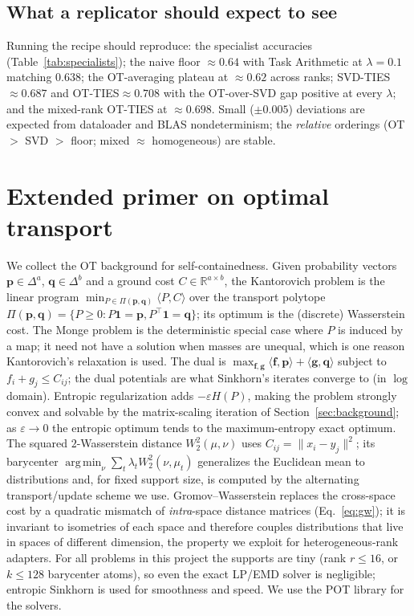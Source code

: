 \documentclass[11pt]{article}
\newcommand{\R}{\mathbb{R}}
\newcommand{\argmin}{\operatorname*{arg\,min}}
\newcommand{\otties}{\textsc{OT-TIES}}
\newcommand{\svdties}{\textsc{SVD-TIES}}
\begin{document}
\subsection{What a replicator should expect to see}
Running the recipe should reproduce: the specialist accuracies (Table~\ref{tab:specialists}); the naive
floor $\approx0.64$ with Task Arithmetic at $\lambda{=}0.1$ matching $0.638$; the OT-averaging plateau at
$\approx0.62$ across ranks; \svdties{}$\approx0.687$ and \otties{}$\approx0.708$ with the OT-over-SVD gap
positive at every $\lambda$; and the mixed-rank \otties{} at $\approx0.698$. Small ($\pm0.005$) deviations
are expected from dataloader and BLAS nondeterminism; the \emph{relative} orderings (OT $>$ SVD $>$ floor;
mixed $\approx$ homogeneous) are stable.

\section{Extended primer on optimal transport}
\label{app:otprimer}
We collect the OT background for self-containedness. Given probability vectors $\bm p\in\Delta^{a}$,
$\bm q\in\Delta^{b}$ and a ground cost $C\in\R^{a\times b}$, the Kantorovich problem is the linear
program $\min_{P\in\Pi(\bm p,\bm q)}\langle P,C\rangle$ over the transport polytope
$\Pi(\bm p,\bm q)=\{P\ge0: P\mathbf 1=\bm p, P^\top\mathbf 1=\bm q\}$; its optimum is the (discrete)
Wasserstein cost. The Monge problem is the deterministic special case where $P$ is induced by a map; it
need not have a solution when masses are unequal, which is one reason Kantorovich's relaxation is used.
The dual is $\max_{\bm f,\bm g}\langle\bm f,\bm p\rangle+\langle\bm g,\bm q\rangle$ subject to
$f_i+g_j\le C_{ij}$; the dual potentials are what Sinkhorn's iterates converge to (in $\log$ domain).
Entropic regularization adds $-\varepsilon H(P)$, making the problem strongly convex and solvable by the
matrix-scaling iteration of Section~\ref{sec:background}; as $\varepsilon\to0$ the entropic optimum tends
to the maximum-entropy exact optimum. The squared $2$-Wasserstein distance $W_2^2(\mu,\nu)$ uses
$C_{ij}=\|x_i-y_j\|^2$; its barycenter $\argmin_\nu\sum_t\lambda_t W_2^2(\nu,\mu_t)$
\citep{agueh2011barycenters} generalizes the Euclidean mean to distributions and, for fixed support size,
is computed by the alternating transport/update scheme we use. Gromov--Wasserstein
\citep{memoli2011gromov} replaces the cross-space cost by a quadratic mismatch of \emph{intra}-space
distance matrices (Eq.~\eqref{eq:gw}); it is invariant to isometries of each space and therefore couples
distributions that live in spaces of different dimension, the property we exploit for
heterogeneous-rank adapters. For all problems in this project the supports are tiny (rank $r\le16$, or
$k\le128$ barycenter atoms), so even the exact LP/EMD solver is negligible; entropic Sinkhorn is used for
smoothness and speed. We use the POT library \citep{flamary2021pot} for the solvers.
\end{document}

